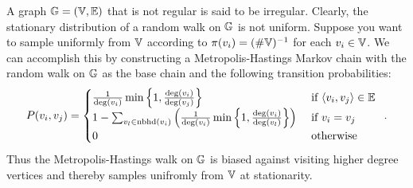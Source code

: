 \begin{model}
A graph $\mathbb{G}=(\mathbb{V},\mathbb{E})$ that is not regular is said to be irregular.  Clearly, the stationary distribution of a random walk on $\mathbb{G}$ is not uniform.  
Suppose you want to sample uniformly from $\mathbb{V}$ according to $\pi(v_i)=(\#\mathbb{V})^{-1}$ for each $v_i \in \mathbb{V}$.  
We can accomplish this by constructing a Metropolis-Hastings Markov chain with the random walk on $\mathbb{G}$ as the base chain and the following transition probabilities:
\[
P(v_i,v_j) = 
\begin{cases}
\frac{1}{\deg(v_i)}\min \left\{ 1, \frac{\deg(v_i)}{\deg(v_j)} \right\} & \text{ if } \langle v_i,v_j \rangle \in \mathbb{E} \\
1 - \sum_{v_l \in \operatorname{nbhd}(v_i)} \left( \frac{1}{\deg(v_i)} \min \left\{ 1, \frac{\deg(v_i)}{\deg(v_l)} \right\} \right) & \text{ if } v_i=v_j\\
0 & \text{ otherwise }
\end{cases} \enspace .
\]
Thus the Metropolis-Hastings walk on $\mathbb{G}$ is biased against visiting higher degree vertices and thereby samples unifromly from $\mathbb{V}$ at stationarity.
\end{model}

